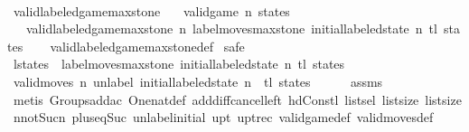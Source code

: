 \begin{isabellebody}
\endisatagproof
{\isafoldproof}%
%
\isadelimproof
\isanewline
%
\endisadelimproof
\ \ \ \ \ \ \ \ \ \ \ \ \ \ \ \ \ \ \ \ \ \ \ \ \ \ \ \ \ \ \ \ \ \ \ \ \ \ \ \ \ \ \ \ \ \ \ \ \ \ \ \ \ \isanewline
{}\isamarkupfalse%
\ valid{\isacharunderscore}labeled{\isacharunderscore}game{\isacharunderscore}max{\isacharunderscore}stone{\isacharcolon}\isanewline
\ \ \ {\isachardoublequoteopen}valid{\isacharunderscore}game\ n\ states{\isachardoublequoteclose}\isanewline
\ \ \ {\isachardoublequoteopen}valid{\isacharunderscore}labeled{\isacharunderscore}game{\isacharunderscore}max{\isacharunderscore}stone\ n\ {\isacharparenleft}label{\isacharunderscore}moves{\isacharunderscore}max{\isacharunderscore}stone\ {\isacharparenleft}initial{\isacharunderscore}labeled{\isacharunderscore}state\ n{\isacharparenright}\ {\isacharparenleft}tl\ states{\isacharparenright}{\isacharparenright}{\isachardoublequoteclose}\isanewline
%
\isadelimproof
\ \ %
\endisadelimproof
%
\isatagproof
{}\isamarkupfalse%
\ valid{\isacharunderscore}labeled{\isacharunderscore}game{\isacharunderscore}max{\isacharunderscore}stone{\isacharunderscore}def\isanewline
{}\isamarkupfalse%
\ safe\isanewline
\ \ \isamarkupfalse%
\ {\isacharquery}l{\isacharunderscore}states\ {\isacharequal}\ {\isachardoublequoteopen}label{\isacharunderscore}moves{\isacharunderscore}max{\isacharunderscore}stone\ {\isacharparenleft}initial{\isacharunderscore}labeled{\isacharunderscore}state\ n{\isacharparenright}\ {\isacharparenleft}tl\ states{\isacharparenright}{\isachardoublequoteclose}\isanewline
\ \ \isamarkupfalse%
\ {\isachardoublequoteopen}valid{\isacharunderscore}moves\ n\ {\isacharparenleft}unlabel\ {\isacharparenleft}initial{\isacharunderscore}labeled{\isacharunderscore}state\ n{\isacharparenright}\ {\isacharhash}\ tl\ states{\isacharparenright}{\isachardoublequoteclose}\isanewline
\ \ \ \ \isamarkupfalse%
\ assms\isanewline
\ \ \ \ \isamarkupfalse%
\ {\isacharparenleft}metis\ Groups{\isachardot}add{\isacharunderscore}ac{\isacharparenleft}{}{\isacharparenright}\ One{\isacharunderscore}nat{\isacharunderscore}def\ add{\isacharunderscore}diff{\isacharunderscore}cancel{\isacharunderscore}left{\isacharprime}\ hd{\isacharunderscore}Cons{\isacharunderscore}tl\ list{\isachardot}sel{\isacharparenleft}{}{\isacharparenright}\ list{\isachardot}size{\isacharparenleft}{}{\isacharparenright}\ list{\isachardot}size{\isacharparenleft}{}{\isacharparenright}\ n{\isacharunderscore}not{\isacharunderscore}Suc{\isacharunderscore}n\ plus{\isacharunderscore}{}{\isacharunderscore}eq{\isacharunderscore}Suc\ unlabel{\isacharunderscore}initial\ upt{\isacharunderscore}{}\ upt{\isacharunderscore}rec\ valid{\isacharunderscore}game{\isacharunderscore}def\ valid{\isacharunderscore}moves{\isacharunderscore}def{\isacharparenright}\isanewline

\end{isabellebody}
